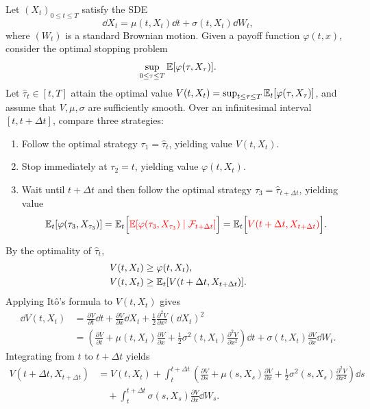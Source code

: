 Let $(X_t)_{0 \le t \le T}$ satisfy the SDE
\[
\dd X_t = \mu(t, X_t)\dd t + \sigma(t, X_t)\dd W_t,
\]
where $(W_t)$ is a standard Brownian motion. Given a payoff function $\varphi(t, x)$, consider the optimal stopping problem
\[
\sup_{0 \le \tau \le T} \mathbb{E}[\varphi(\tau, X_\tau)].
\]
Let $\hat{\tau}_t \in [t, T]$ attain the optimal value $V(t, X_t) = \sup_{t \le \tau \le T} \mathbb{E}_t[\varphi(\tau, X_\tau)]$, and assume that $V, \mu, \sigma$ are sufficiently smooth. Over an infinitesimal interval $[t, t + \Delta t]$, compare three strategies:
\begin{enumerate}
    \item Follow the optimal strategy $\tau_1 = \hat{\tau}_t$, yielding value $V(t, X_t)$.
    \item Stop immediately at $\tau_2 = t$, yielding value $\varphi(t, X_t)$.
    \item Wait until $t + \Delta t$ and then follow the optimal strategy $\tau_3 = \hat{\tau}_{t+\Delta t}$, yielding value
    \[
    \mathbb{E}_t[\varphi(\tau_3, X_{\tau_3})] = \mathbb{E}_t\Bigl[\textcolor{red}{\mathbb{E}[\varphi(\tau_3, X_{\tau_3}) \mid \mathcal{F}_{t+\Delta t}]}\Bigr] = \mathbb{E}_t\Bigl[\textcolor{red}{V(t + \Delta t, X_{t+\Delta t})}\Bigr].
    \]
\end{enumerate}
By the optimality of $\hat{\tau}_t$,
\[
\begin{aligned}
    V(t, X_t) &\ge \varphi(t, X_t), \\
    V(t, X_t) &\ge \mathbb{E}_t[V(t + \Delta t, X_{t+\Delta t})].
\end{aligned}
\]
Applying It\^{o}'s formula to $V(t, X_t)$ gives
\[
\begin{aligned}
    \dd V(t, X_t) &= \frac{\partial V}{\partial t}\dd t + \frac{\partial V}{\partial x}\dd X_t + \frac{1}{2}\frac{\partial^2 V}{\partial x^2}(\dd X_t)^2 \\
    &= \left(\frac{\partial V}{\partial t} + \mu(t, X_t)\frac{\partial V}{\partial x} + \frac{1}{2}\sigma^2(t, X_t)\frac{\partial^2 V}{\partial x^2}\right)\dd t + \sigma(t, X_t)\frac{\partial V}{\partial x}\dd W_t.
\end{aligned}
\]
Integrating from $t$ to $t + \Delta t$ yields
\[
\begin{aligned}
    V(t + \Delta t, X_{t+\Delta t}) &= V(t, X_t) + \int_t^{t+\Delta t} \left(\frac{\partial V}{\partial s} + \mu(s, X_s)\frac{\partial V}{\partial x} + \frac{1}{2}\sigma^2(s, X_s)\frac{\partial^2 V}{\partial x^2}\right)\dd s \\
    &\quad + \int_t^{t+\Delta t} \sigma(s, X_s)\frac{\partial V}{\partial x}\dd W_s.
\end{aligned}
\]
